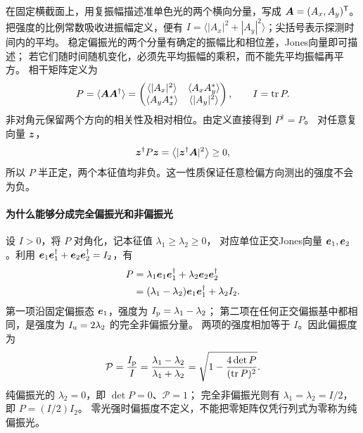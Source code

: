 在固定横截面上，用复振幅描述准单色光的两个横向分量，写成
$\bm{A}=(A_x,A_y)^{\mathsf T}$。把强度的比例常数吸收进振幅定义，便有
$I=\langle|A_x|^2+|A_y|^2\rangle$；尖括号表示探测时间内的平均。
稳定偏振光的两个分量有确定的振幅比和相位差，Jones向量即可描述；
若它们随时间随机变化，必须先平均振幅的乘积，而不能先平均振幅再平方。
相干矩阵定义为
\[
 P=\langle\bm{A}\bm{A}^\dagger\rangle
 =\begin{pmatrix}
 \langle|A_x|^2\rangle&\langle A_xA_y^*\rangle\\
 \langle A_yA_x^*\rangle&\langle|A_y|^2\rangle
 \end{pmatrix},\qquad I=\operatorname{tr}P.
\]
非对角元保留两个方向的相关性及相对相位。由定义直接得到 $P^\dagger=P$。
对任意复向量 $\bm{z}$，
\[
 \bm{z}^\dagger P\bm{z}
 =\left\langle|\bm{z}^\dagger\bm{A}|^2\right\rangle\ge0,
\]
所以 $P$ 半正定，两个本征值均非负。这一性质保证任意检偏方向测出的强度不会为负。

\paragraph{为什么能够分成完全偏振光和非偏振光}
设 $I>0$，将 $P$ 对角化，记本征值 $\lambda_1\ge\lambda_2\ge0$，
对应单位正交Jones向量 $\bm{e}_1,\bm{e}_2$。利用
$\bm{e}_1\bm{e}_1^\dagger+\bm{e}_2\bm{e}_2^\dagger=I_2$，有
\[
 \begin{aligned}
 P&=\lambda_1\bm{e}_1\bm{e}_1^\dagger
       +\lambda_2\bm{e}_2\bm{e}_2^\dagger\\
  &=(\lambda_1-\lambda_2)\bm{e}_1\bm{e}_1^\dagger+\lambda_2 I_2.
 \end{aligned}
\]
第一项沿固定偏振态 $\bm{e}_1$，强度为 $I_{\rm p}=\lambda_1-\lambda_2$；
第二项在任何正交偏振基中都相同，是强度为 $I_{\rm u}=2\lambda_2$ 的完全非偏振分量。
两项的强度相加等于 $I$。因此偏振度为
\[
 \mathcal P=\frac{I_{\rm p}}I
 =\frac{\lambda_1-\lambda_2}{\lambda_1+\lambda_2}
 =\sqrt{1-\frac{4\det P}{(\operatorname{tr}P)^2}}.
\]
纯偏振光的 $\lambda_2=0$，即 $\det P=0$、$\mathcal P=1$；
完全非偏振光则有 $\lambda_1=\lambda_2=I/2$，即 $P=(I/2)I_2$。
零光强时偏振度不定义，不能把零矩阵仅凭行列式为零称为纯偏振光。

